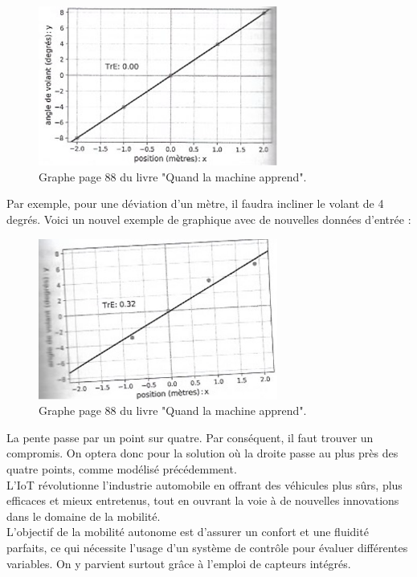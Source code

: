 \begin{figure}[H]
    \centering
    \includegraphics[width=0.7\textwidth]{images/graph1_yannLeCun.png} 
    \caption{Graphe page 88 du livre "Quand la machine apprend".}
\end{figure}
Par exemple, pour une déviation d’un mètre, il faudra incliner le volant de 4 degrés. 
Voici un nouvel exemple de graphique avec de nouvelles données d’entrée :
\begin{figure}[H]
    \centering
    \includegraphics[width=0.7\textwidth]{images/graph2_yannLeCun.jpg} 
    \caption{Graphe page 88 du livre "Quand la machine apprend".}
\end{figure}
La pente passe par un point sur quatre. Par conséquent, il faut trouver un compromis. On optera donc pour la solution où la droite passe au plus près des quatre points, comme modélisé précédemment. \\
L’IoT révolutionne l’industrie automobile en offrant des véhicules plus sûrs, plus efficaces et mieux entretenus, tout en ouvrant la voie à de nouvelles innovations dans le domaine de la mobilité.\\
L'objectif de la mobilité autonome est d'assurer un confort et une fluidité parfaits, ce qui nécessite l'usage d'un système de contrôle pour évaluer différentes variables. On y parvient surtout grâce à l'emploi de capteurs intégrés.\\
